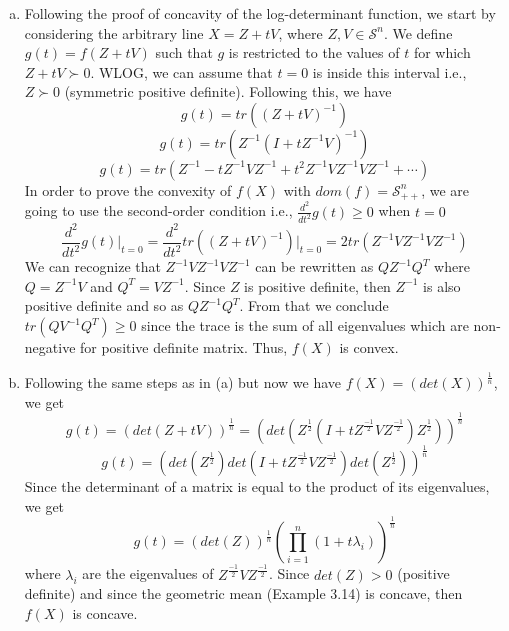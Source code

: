 \documentclass[12pt] {article}
\begin{document}
\begin{enumerate}[(a)]
\item Following the proof of concavity of the log-determinant function, we start by considering the arbitrary line $X = Z + tV$, where $Z, V \in \mathcal{S}^{n}$. We define $g(t)=f(Z+tV)$ such that $g$ is restricted to the values of $t$ for which $Z+tV \succ 0$. WLOG, we can assume that $t=0$ is inside this interval i.e., $Z \succ 0$ (symmetric positive definite). Following this, we have
$$
g(t) = tr((Z+tV)^{-1})
$$
$$
g(t) = tr(Z^{-1} (I+tZ^{-1}V)^{-1})
$$
$$
g(t) = tr(Z^{-1} - tZ^{-1}VZ^{-1} + t^{2}Z^{-1}VZ^{-1}VZ^{-1}+\cdots)
$$
In order to prove the convexity of $f(X)$ with $dom(f)=\mathcal{S}^{n}_{++}$, we are going to use the second-order condition i.e., $\frac{d^{2}}{dt^{2}} g(t) \geq 0$ when $t=0$
$$
\frac{d^{2}}{dt^{2}} g(t) \bigg|_{t=0} = \frac{d^{2}}{dt^{2}} tr((Z+tV)^{-1}) \bigg|_{t=0} = 2tr(Z^{-1}VZ^{-1}VZ^{-1})
$$
We can recognize that $Z^{-1}VZ^{-1}VZ^{-1}$ can be rewritten as $QZ^{-1}Q^{T}$ where $Q=Z^{-1}V$ and $Q^{T}=VZ^{-1}$. Since $Z$ is positive definite, then $Z^{-1}$ is also positive definite and so as $QZ^{-1}Q^{T}$. From that we conclude $tr(QV^{-1}Q^{T})\geq 0$ since the trace is the sum of all eigenvalues which are non-negative for positive definite matrix. Thus, $f(X)$ is convex. 
\item Following the same steps as in (a) but now we have $f(X) = (det(X))^{\frac{1}{n}}$, we get
$$
g(t) = (det(Z+tV))^{\frac{1}{n}} = \left(det \left( Z^{\frac{1}{2}} \left( I+tZ^{\frac{-1}{2}}VZ^{\frac{-1}{2}}\right)Z^{\frac{1}{2}}\right)\right)^{\frac{1}{n}}
$$
$$
g(t) = \left(det\left(Z^{\frac{1}{2}}\right) det\left(I+tZ^{\frac{-1}{2}}VZ^{\frac{-1}{2}}\right) det\left(Z^{\frac{1}{2}}\right) \right)^{\frac{1}{n}}
$$
Since the determinant of a matrix is equal to the product of its eigenvalues, we get 
$$
g(t) = \left(det\left(Z\right)\right)^{\frac{1}{n}}\left( \prod^{n}_{i=1}(1+t\lambda_{i}) \right)^{\frac{1}{n}}
$$
where $\lambda_{i}$ are the eigenvalues of $Z^{\frac{-1}{2}}VZ^{\frac{-1}{2}}$.  Since $det(Z) > 0$ (positive definite) and since the geometric mean (Example 3.14) is concave, then $f(X)$ is concave. 

\end{enumerate}
\end{document}
